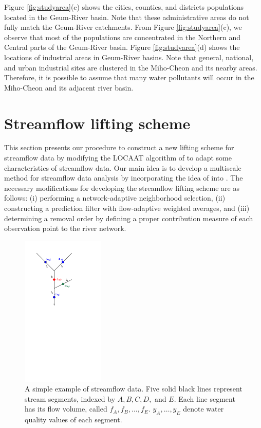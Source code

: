 \documentclass[11pt,titlepage]{article}
\begin{document}
Figure \ref{fig:studyarea}(c) shows the cities, counties, and districts populations located in the Geum-River basin. Note that these administrative areas do not fully match the Geum-River catchments. From Figure \ref{fig:studyarea}(c), we observe that most of the populations are concentrated in the Northern and Central parts of the Geum-River basin. Figure \ref{fig:studyarea}(d) shows the locations of industrial areas in Geum-River basins. Note that general, national, and urban industrial sites are clustered in the Miho-Cheon and its nearby areas. Therefore, it is possible to assume that many water pollutants will occur in the Miho-Cheon and its adjacent river basin.


\section{Streamflow lifting scheme}\label{sec:streamflowliftingscheme}

This section presents our procedure to construct a new lifting scheme for streamflow data by modifying the LOCAAT algorithm of  \citet{Jansen2009} to adapt some characteristics of streamflow data. Our main idea is to develop a multiscale method for streamflow data analysis by incorporating the idea of \cite{Nunes2006} into \cite{ODonnell2014}. The necessary modifications for developing the streamflow lifting scheme are as follows: (i) performing a network-adaptive neighborhood selection, (ii) constructing a prediction filter with flow-adaptive weighted averages, and (iii) determining a removal order by defining a proper contribution measure of each observation point to the river network.

\begin{figure}
	\centering\includegraphics[width=0.35\textwidth]{Stream_result/Node-flow-complexed2-3.pdf}
	\vspace{-0mm}
	\caption{A simple example of streamflow data. Five solid black lines represent stream segments, indexed by $A,B,C,D,$ and $E$. Each line segment has its flow volume, called $f_{A}, f_{B}, \ldots, f_E$. $y_{A}, \ldots , y_{E}$ denote water quality values of each segment.}
	\label{fig:nodedescription}
\end{figure}
\end{document}
